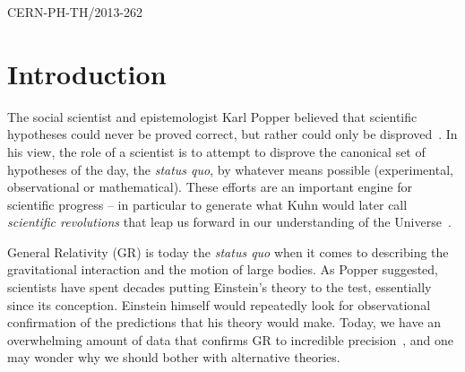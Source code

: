 \documentclass[prd,aps,twocolumn,nofootinbib,showpacs,superscriptaddress]{revtex4-1}
\begin{document}
\onecolumngrid
\begin{flushright}
\small  CERN-PH-TH/2013-262
\end{flushright}

\maketitle



\section{Introduction}

The social scientist and epistemologist Karl Popper believed that
scientific hypotheses could never be proved correct, but rather could
only be disproved~\cite{popper}. In his view, the role of a scientist
is to attempt to disprove the canonical set of hypotheses of the day,
the {\textit{status quo}}, by whatever means possible (experimental, observational or mathematical). 
These efforts are an important engine for scientific progress -- in particular to generate what Kuhn
would later call  {\textit{scientific revolutions}} that leap us
forward in our understanding of the Universe~\cite{khun}. 

General Relativity (GR) is today the {\it status quo} when it comes to
describing the gravitational interaction and the motion of large
bodies. As Popper suggested, scientists have spent decades putting
Einstein's theory to the test, essentially since its
conception. Einstein himself would repeatedly look for
observational confirmation of the predictions that his theory would
make. Today, we have an overwhelming amount of data that confirms GR
to incredible precision~\cite{will-living}, and one may wonder why
we should bother with alternative theories.  
\end{document}
